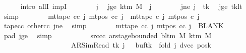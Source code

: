 \begin{isabellebody}
\ \ \ \ \isamarkupfalse%
\ {\isacharparenleft}{\kern0pt}intro\ allI\ impI{\isacharparenright}{\kern0pt}\isanewline
\ \ \ \ \ \ \isamarkupfalse%
\ j{\isacharprime}{\kern0pt}\ \isamarkupfalse%
\ jge{\isacharcolon}{\kern0pt}\ {\isachardoublequoteopen}k{\isacharunderscore}{\kern0pt}tm\ M\ {\isasymle}\ j{\isacharprime}{\kern0pt}{\isachardoublequoteclose}\isanewline
\ \ \ \ \ \ \isamarkupfalse%
\ jne{\isacharcolon}{\kern0pt}\ {\isachardoublequoteopen}j{\isacharprime}{\kern0pt}\ {\isasymnoteq}\ tk{\isachardoublequoteclose}\ \isamarkupfalse%
\ jge\ tk{\isacharunderscore}{\kern0pt}lt\ \isamarkupfalse%
\ simp\isanewline
\ \ \ \ \ \ \isamarkupfalse%
\ {\isachardoublequoteopen}mt{\isacharunderscore}{\kern0pt}tape\ cc\ j{\isacharprime}{\kern0pt}\ {\isacharparenleft}{\kern0pt}mt{\isacharunderscore}{\kern0pt}pos\ cc\ j{\isacharprime}{\kern0pt}{\isacharparenright}{\kern0pt}\ {\isacharequal}{\kern0pt}\ mt{\isacharunderscore}{\kern0pt}tape\ c{\isacharprime}{\kern0pt}\ j{\isacharprime}{\kern0pt}\ {\isacharparenleft}{\kern0pt}mt{\isacharunderscore}{\kern0pt}pos\ c{\isacharprime}{\kern0pt}\ j{\isacharprime}{\kern0pt}{\isacharparenright}{\kern0pt}{\isachardoublequoteclose}\isanewline
\ \ \ \ \ \ \ \ \isamarkupfalse%
\ tape{\isacharunderscore}{\kern0pt}cc\ other{\isacharunderscore}{\kern0pt}cc\ jne\ \isamarkupfalse%
\ simp\isanewline
\ \ \ \ \ \ \isamarkupfalse%
\ {\isachardoublequoteopen}mt{\isacharunderscore}{\kern0pt}tape\ cc\ j{\isacharprime}{\kern0pt}\ {\isacharparenleft}{\kern0pt}mt{\isacharunderscore}{\kern0pt}pos\ cc\ j{\isacharprime}{\kern0pt}{\isacharparenright}{\kern0pt}\ {\isacharequal}{\kern0pt}\ BLANK{}{\isachardoublequoteclose}\ \isamarkupfalse%
\ pad{}\ jge\ \isamarkupfalse%
\ simp\isanewline
\ \ \ \ \isamarkupfalse%
\isanewline
\ \ \ \ \isamarkupfalse%
\ src{\isacharunderscore}{\kern0pt}cc{\isacharcolon}{\kern0pt}\ {\isachardoublequoteopen}ar{\isacharunderscore}{\kern0pt}stage{\isacharunderscore}{\kern0pt}bounded\ {\isacharparenleft}{\kern0pt}bl{\isacharunderscore}{\kern0pt}tm\ M{\isacharparenright}{\kern0pt}\ {\isacharparenleft}{\kern0pt}k{\isacharunderscore}{\kern0pt}tm\ M{\isacharparenright}{\kern0pt}\isanewline
\ \ \ \ \ \ \ \ \ \ \ \ \ \ \ \ \ \ \ \ {\isacharparenleft}{\kern0pt}AR{\isacharunderscore}{\kern0pt}SimRead{\isacharcomma}{\kern0pt}\ tk{\isacharcomma}{\kern0pt}\ j\ {\isacharplus}{\kern0pt}\ {}{\isacharcomma}{\kern0pt}\ buf{}{\isacharparenleft}{\kern0pt}tk\ {\isacharcolon}{\kern0pt}{\isacharequal}{\kern0pt}\ {\isacharquery}{\kern0pt}fold\ j{\isacharparenright}{\kern0pt}{\isacharcomma}{\kern0pt}\ dvec{\isacharcomma}{\kern0pt}\ posk{\isacharparenright}{\kern0pt}{\isachardoublequoteclose}\isanewline

\end{isabellebody}
